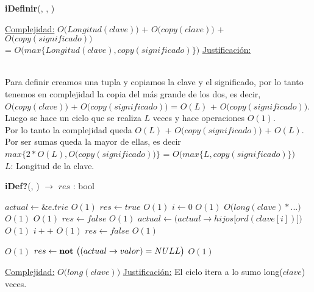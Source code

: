 \begin{Algoritmos}
\begin{algorithm}[H]{\textbf{iDefinir}(, , )}
\begin{algorithmic}
        \medskip
        \Statex \underline{Complejidad:} {$O\big(Longitud(clave)\big)$ + $O\big(copy(clave)\big)$ + $O\big(copy(significado)\big)$ \\
        \somequad = $O\big(max\{Longitud(clave), copy(significado)\}\big)$}
        \Statex \underline{Justificación:} {\\
\quad\quad Para definir creamos una tupla y copiamos la clave y el significado, por lo tanto tenemos en complejidad la copia del más grande de los dos, es decir, $O\big(copy(clave)\big)$ + $O\big(copy(significado)\big)$ = $O(L)$ + $O\big(copy(significado)\big)$. \\
\quad\quad Luego se hace un ciclo que se realiza $L$ veces y hace operaciones $O(1)$. \\
\quad\quad Por lo tanto la complejidad queda $O(L)$ + $O\big(copy(significado)\big)$ + $O(L)$. Por ser sumas queda la mayor de ellas, es decir $max\{2*O(L), O\big(copy(significado)\big)\}$ = $O\big(max\{L, copy(significado)\}\big)$ \\
\quad\quad $L$: Longitud de la clave.


        }
      \end{algorithmic}
\end{algorithm}

\begin{algorithm}[H]{\textbf{iDef?}(, ) $\to$ $res$ : bool}
      \begin{algorithmic}
        \State $actual \gets \&e.trie$     \Comment $O(1)$
        \State $res \gets true$     \Comment $O(1)$
        \State $i \gets 0$     \Comment $O(1)$
         \Comment $O\big(long(clave) * ...\big)$
           \Comment $O(1)$
             \Comment $O(1)$
              \State $res \gets false$ \Comment $O(1)$
            \Else
              \State $actual \gets \big(actual \to hijos\big[ord(clave[i])\big]\big)$ \Comment $O(1)$
            \EndIf
            \State $i++$  \Comment $O(1)$
          \Else
            \State $res \gets false$ \Comment $O(1)$
          \EndIf
        \EndWhile
        \State $ $

          \Comment $O(1)$
          \State $res \gets \textbf{not}\ \big((actual \to valor) = NULL\big)$ \Comment $O(1)$
        \EndIf

        \medskip
        \Statex \underline{Complejidad:} {$O\big(long(clave)\big)$}
        \Statex \underline{Justificación:} {El ciclo itera a lo sumo long($clave$) veces.}
      \end{algorithmic}
\end{algorithm}


\end{Algoritmos}
